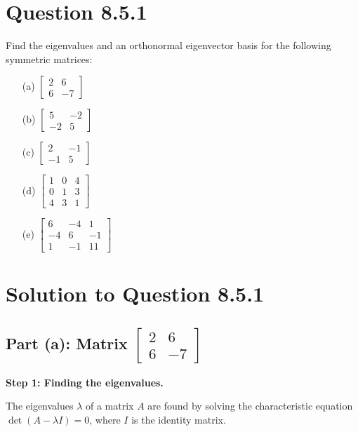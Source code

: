 \documentclass[12pt]{article}
\begin{document}
\newpage
\section*{Question 8.5.1}
Find the eigenvalues and an orthonormal eigenvector basis for the following symmetric matrices:
\begin{itemize}
    \item[(a)] \( \begin{bmatrix} 2 & 6 \\ 6 & -7 \end{bmatrix} \)
    \item[(b)] \( \begin{bmatrix} 5 & -2 \\ -2 & 5 \end{bmatrix} \)
    \item[(c)] \( \begin{bmatrix} 2 & -1 \\ -1 & 5 \end{bmatrix} \)
    \item[(d)] \( \begin{bmatrix} 1 & 0 & 4 \\ 0 & 1 & 3 \\ 4 & 3 & 1 \end{bmatrix} \)
    \item[(e)] \( \begin{bmatrix} 6 & -4 & 1 \\ -4 & 6 & -1 \\ 1 & -1 & 11 \end{bmatrix} \)
\end{itemize}

\section*{Solution to Question 8.5.1}

\subsection*{Part (a): Matrix \( \begin{bmatrix} 2 & 6 \\ 6 & -7 \end{bmatrix} \)}

\textbf{Step 1: Finding the eigenvalues.}

The eigenvalues \(\lambda\) of a matrix \(A\) are found by solving the characteristic equation \(\det(A - \lambda I) = 0\), where \(I\) is the identity matrix.
\end{document}
